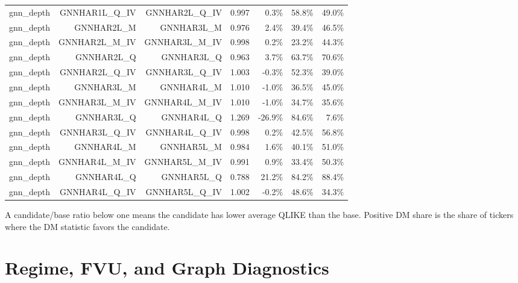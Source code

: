 \documentclass[11pt,a4paper]{article}
\begin{document}
\begin{table}[H]
{\begin{tabular}{lrrrrrr}
gnn\_depth & GNNHAR1L\_Q\_IV & GNNHAR2L\_Q\_IV & 0.997 & 0.3\% & 58.8\% & 49.0\% \\
gnn\_depth & GNNHAR2L\_M & GNNHAR3L\_M & 0.976 & 2.4\% & 39.4\% & 46.5\% \\
gnn\_depth & GNNHAR2L\_M\_IV & GNNHAR3L\_M\_IV & 0.998 & 0.2\% & 23.2\% & 44.3\% \\
gnn\_depth & GNNHAR2L\_Q & GNNHAR3L\_Q & 0.963 & 3.7\% & 63.7\% & 70.6\% \\
gnn\_depth & GNNHAR2L\_Q\_IV & GNNHAR3L\_Q\_IV & 1.003 & -0.3\% & 52.3\% & 39.0\% \\
gnn\_depth & GNNHAR3L\_M & GNNHAR4L\_M & 1.010 & -1.0\% & 36.5\% & 45.0\% \\
gnn\_depth & GNNHAR3L\_M\_IV & GNNHAR4L\_M\_IV & 1.010 & -1.0\% & 34.7\% & 35.6\% \\
gnn\_depth & GNNHAR3L\_Q & GNNHAR4L\_Q & 1.269 & -26.9\% & 84.6\% & 7.6\% \\
gnn\_depth & GNNHAR3L\_Q\_IV & GNNHAR4L\_Q\_IV & 0.998 & 0.2\% & 42.5\% & 56.8\% \\
gnn\_depth & GNNHAR4L\_M & GNNHAR5L\_M & 0.984 & 1.6\% & 40.1\% & 51.0\% \\
gnn\_depth & GNNHAR4L\_M\_IV & GNNHAR5L\_M\_IV & 0.991 & 0.9\% & 33.4\% & 50.3\% \\
gnn\_depth & GNNHAR4L\_Q & GNNHAR5L\_Q & 0.788 & 21.2\% & 84.2\% & 88.4\% \\
gnn\_depth & GNNHAR4L\_Q\_IV & GNNHAR5L\_Q\_IV & 1.002 & -0.2\% & 48.6\% & 34.3\% \\
\bottomrule
\end{tabular}
}

\vspace{2pt}\begin{minipage}{0.98\textwidth}\footnotesize A candidate/base ratio below one means the candidate has lower average QLIKE than the base.  Positive DM share is the share of tickers where the DM statistic favors the candidate.\end{minipage}
\end{table}

\section{Regime, FVU, and Graph Diagnostics}
\end{document}
